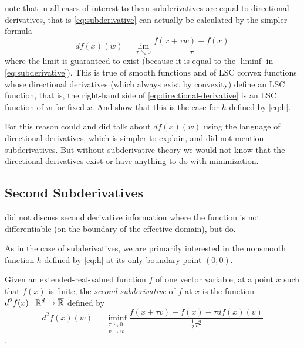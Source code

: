 \citet{reaster-tr} note that in all cases of interest to them
subderivatives are equal to directional derivatives,
that is \eqref{eq:subderivative} can actually be calculated by the simpler
formula
\begin{equation} \label{eq:directional-derivative}
   d f(x)(w) = \lim_{\tau \searrow 0}
   \frac{f(x + \tau w) - f(x)}{\tau}
\end{equation}
where the limit is guaranteed to exist (because it is equal to the $\liminf$
in \eqref{eq:subderivative}).
This is true of smooth functions and of LSC convex functions whose directional
derivatives (which always exist by convexity) define an LSC function,
that is, the right-hand side of \eqref{eq:directional-derivative} is
an LSC function of $w$ for fixed $x$.  And \citet[Section~1.10.3]{reaster-tr}
show that this is the case for $h$ defined by \eqref{eq:h}.

For this reason \citet{reaster} could and did talk about $d f(x)(w)$ using
the language of directional derivatives, which is simpler to explain, and
did not mention subderivatives.  But without subderivative theory
\citep[Chapters~8 and~10]{rockafellar-wets} we would not know that the
directional derivatives exist or have anything to do with minimization.

\subsection{Second Subderivatives}
\label{sec:second-subderivatives}

\citet{reaster-tr,reaster} did not discuss second derivative information
where the function is not differentiable (on the boundary of the effective
domain), but \citet[Chapter~13]{rockafellar-wets} do.

As in the case of subderivatives, we are primarily interested in the nonsmooth
function $h$ defined by \eqref{eq:h} at its only boundary point $(0, 0)$.

Given an extended-real-valued function $f$ of one vector variable,
at a point $x$ such that $f(x)$ is finite,
the \emph{second subderivative} of $f$ at $x$ is
the function $d^2 f(x) : \mathbb{R}^d \to \overline{\mathbb{R}}$ defined by
\begin{equation} \label{eq:second-subderivative}
   d^2 f(x)(w) = \liminf_{\substack{\tau \searrow 0 \\ v \to w}}
   \frac{f(x + \tau v) - f(x) - \tau d f(x)(v)}{\frac{1}{2} \tau^2}
\end{equation}
\citep[Definition~13.3]{rockafellar-wets}.


